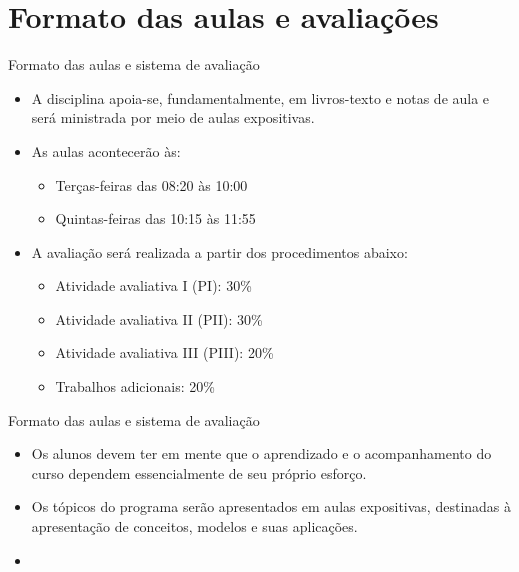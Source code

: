 \documentclass[10pt]{beamer}
\begin{document}
\section{Formato das aulas e avaliações}
\begin{frame}{Formato das aulas e sistema de avaliação}
    \begin{itemize}
        \item A disciplina apoia-se, fundamentalmente, em livros-texto e notas de aula e será ministrada por meio de aulas expositivas.\bigskip

        \item As aulas acontecerão às:\medskip
              \begin{itemize}
                  \item Terças-feiras das 08:20 às 10:00\medskip
                  \item Quintas-feiras das 10:15 às 11:55\bigskip
              \end{itemize}

        \item A avaliação será realizada a partir dos procedimentos abaixo:\medskip
              \begin{itemize}
                  \item Atividade avaliativa I (PI): 30\%\medskip
                  \item Atividade avaliativa II (PII): 30\%\medskip
                  \item Atividade avaliativa III (PIII): 20\%\medskip
                  \item Trabalhos adicionais: 20\%
              \end{itemize}
    \end{itemize}
\end{frame}

\begin{frame}{Formato das aulas e sistema de avaliação}
    \begin{itemize}
        \item Os alunos devem ter em mente que o aprendizado e o acompanhamento do curso dependem essencialmente de seu próprio esforço.\bigskip

        \item Os tópicos do programa serão apresentados em aulas expositivas, destinadas à apresentação de conceitos, modelos e suas aplicações.\bigskip

        \item[\emoji{warning}] 
    \end{itemize}

\end{frame}
\end{document}
